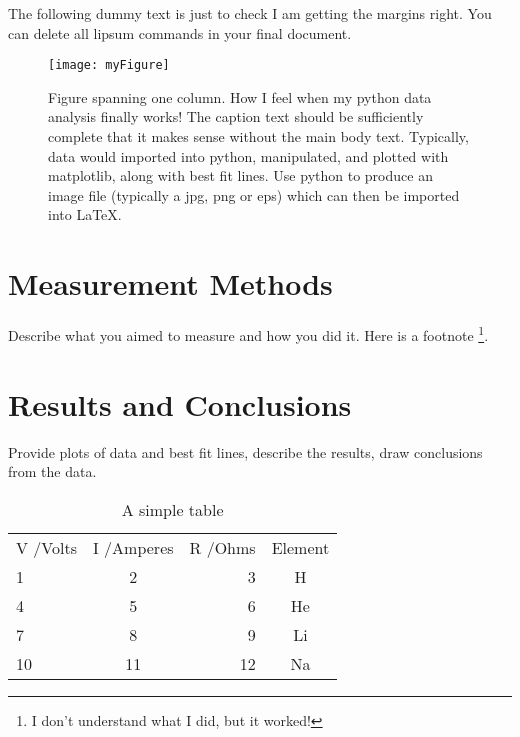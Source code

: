 \documentclass[10pt, twocolumn, twoside]{article}
\begin{document}
The following dummy text is just to check I am getting the margins right. You can delete all lipsum commands in your final document.


\vspace{1cm} %


\lipsum[1-3]



\begin{figure}[ht] %
\texttt{[image: myFigure]}
\caption[width=\columnwidth]{Figure spanning one column. How I feel when my python data analysis finally works! The caption text should be sufficiently complete that it makes sense without the main body text. Typically, data would imported into python, manipulated, and plotted with matplotlib, along with best fit lines. Use python to produce an image file (typically a jpg, png or eps) which can then be imported into LaTeX.}
\end{figure}




\section{Measurement Methods}
Describe what you aimed to measure and how you did it. Here is a footnote \footnote{I don't understand what I did, but it worked!}.

\lipsum[1-2]
\section{Results and Conclusions}
Provide plots of data and best fit lines, describe the results, draw conclusions from the data.



\begin{table}[!ht] %
  \begin{center}
    \begin{tabular}{| l c r c |} %
    \hline
    V /Volts & I /Amperes & R /Ohms & Element \\
    1 & 2 & 3 & H \\
    4 & 5 & 6 & He \\
    7 & 8 & 9 & Li \\
    10 & 11 & 12 & Na \\
    \hline
    \end{tabular}
  \end{center}
  \caption{A simple table}
\end{table}
\end{document}
